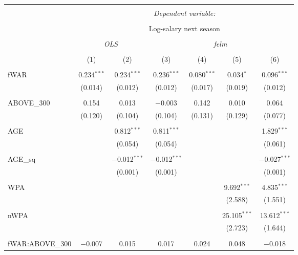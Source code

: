 
\begin{table}[!htbp] \centering
  \caption{}
  \label{}
  \scriptsize
\begin{tabular}{@{\extracolsep{5pt}}lcccccc}
\\[-1.8ex]\hline
\hline \\[-1.8ex]
 & \multicolumn{6}{c}{\textit{Dependent variable:}} \\
\cline{2-7}
\\[-1.8ex] & \multicolumn{6}{c}{Log-salary next season} \\ 
\\[-1.8ex] & \multicolumn{2}{c}{\textit{OLS}} & \multicolumn{4}{c}{\textit{felm}} \\
\\[-1.8ex] & (1) & (2) & (3) & (4) & (5) & (6)\\
\hline \\[-1.8ex]
 fWAR & 0.234$^{***}$ & 0.234$^{***}$ & 0.236$^{***}$ & 0.080$^{***}$ & 0.034$^{*}$ & 0.096$^{***}$ \\
  & (0.014) & (0.012) & (0.012) & (0.017) & (0.019) & (0.012) \\
  & & & & & & \\
 ABOVE\_300 & 0.154 & 0.013 & $-$0.003 & 0.142 & 0.010 & 0.064 \\
  & (0.120) & (0.104) & (0.104) & (0.131) & (0.129) & (0.077) \\
  & & & & & & \\
 AGE &  & 0.812$^{***}$ & 0.811$^{***}$ &  &  & 1.829$^{***}$ \\
  &  & (0.054) & (0.054) &  &  & (0.061) \\
  & & & & & & \\
 AGE\_sq &  & $-$0.012$^{***}$ & $-$0.012$^{***}$ &  &  & $-$0.027$^{***}$ \\
  &  & (0.001) & (0.001) &  &  & (0.001) \\
  & & & & & & \\
 WPA &  &  &  &  & 9.692$^{***}$ & 4.835$^{***}$ \\
  &  &  &  &  & (2.588) & (1.551) \\
  & & & & & & \\
 nWPA &  &  &  &  & 25.105$^{***}$ & 13.612$^{***}$ \\
  &  &  &  &  & (2.723) & (1.644) \\
  & & & & & & \\
 fWAR:ABOVE\_300 & $-$0.007 & 0.015 & 0.017 & 0.024 & 0.048 & $-$0.018 \\

\end{tabular}
\end{table}
